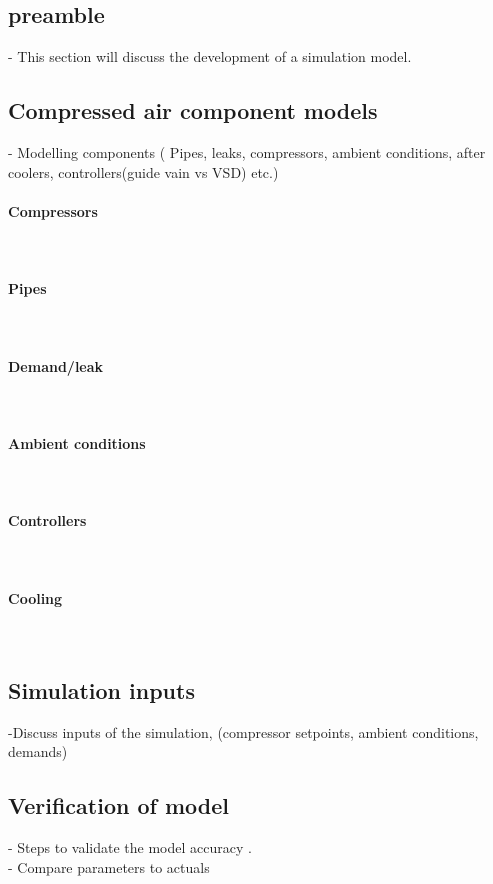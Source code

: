 	\subsection{preamble}
		- This section will discuss the development of a simulation model.
	\subsection{Compressed air component models}
		- Modelling components ( Pipes, leaks, compressors,  ambient conditions, after coolers, controllers(guide vain vs VSD) etc.)
		\paragraph{Compressors}\leavevmode\\
		\paragraph{Pipes}\leavevmode\\
		\paragraph{Demand/leak}\leavevmode\\
		\paragraph{Ambient conditions}\leavevmode\\
		\paragraph{Controllers}\leavevmode\\
		\paragraph{Cooling}\leavevmode\\
	\subsection{Simulation inputs}
		-Discuss inputs of the simulation, (compressor setpoints, ambient conditions, demands)
	\subsection{Verification of model}
		- Steps to validate  the model accuracy .\\
		- Compare parameters to actuals
